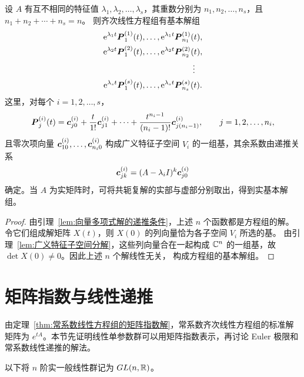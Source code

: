 \begin{theorem}\label{thm:重特征值常系数方程组的基本解组}
	设 $A$ 有互不相同的特征值
	$\lambda_1,\lambda_2,\ldots,\lambda_s$，其重数分别为
	$n_1,n_2,\ldots,n_s$，且 $n_1+n_2+\cdots+n_s=n$。
	则齐次线性方程组有基本解组
	\[
		\begin{gathered}
		\mathrm{e}^{\lambda_1t}\vect{P}^{(1)}_1(t),
		\ldots,
		\mathrm{e}^{\lambda_1t}\vect{P}^{(1)}_{n_1}(t),\\
		\mathrm{e}^{\lambda_2t}\vect{P}^{(2)}_1(t),
		\ldots,
		\mathrm{e}^{\lambda_2t}\vect{P}^{(2)}_{n_2}(t),\\
		\hspace{3.5cm}\vdots\\
		\mathrm{e}^{\lambda_st}\vect{P}^{(s)}_1(t),
		\ldots,
		\mathrm{e}^{\lambda_st}\vect{P}^{(s)}_{n_s}(t).
		\end{gathered}
	\]
	这里，对每个 $i=1,2,\ldots,s$，
	\[
		\boldsymbol{P}^{(i)}_j(t)
		=\boldsymbol{c}^{(i)}_{j0}
		+\dfrac{t}{1!}\boldsymbol{c}^{(i)}_{j1}
		+\cdots
		+\dfrac{t^{n_i-1}}{(n_i-1)!}
		\boldsymbol{c}^{(i)}_{j(n_i-1)},
		\qquad j=1,2,\ldots,n_i,
	\]
	且零次项向量
	$\boldsymbol{c}^{(i)}_{10},\ldots,\boldsymbol{c}^{(i)}_{n_i0}$
	构成广义特征子空间 $V_i$ 的一组基，其余系数由递推关系
	\[
		\boldsymbol{c}^{(i)}_{jk}
		=(A-\lambda_iI)^k\boldsymbol{c}^{(i)}_{j0}
	\]
	确定。当 $A$ 为实矩阵时，可将共轭复解的实部与虚部分别取出，得到实基本解组。
\end{theorem}

\begin{proof}
	由引理~\ref{lem:向量多项式解的递推条件}，上述 $n$ 个函数都是方程组的解。
	令它们组成解矩阵 $X(t)$，则 $X(0)$ 的列向量恰为各子空间 $V_i$ 所选的基。
	由引理~\ref{lem:广义特征子空间分解}，这些列向量合在一起构成
	$\mathbb{C}^n$ 的一组基，故 $\det X(0)\neq0$。因此上述 $n$ 个解线性无关，
	构成方程组的基本解组。
\end{proof}

\section{矩阵指数与线性递推}\label{sec:linear-evolution}
由定理~\ref{thm:常系数线性方程组的矩阵指数解}，常系数齐次线性方程组的标准解矩阵为 $e^{tA}$。本节先证明线性单参数群可以用矩阵指数表示，再讨论 Euler 极限和常系数线性递推的解法。

以下将 $n$ 阶实一般线性群记为 $GL(n,\mathbb{R})$。

